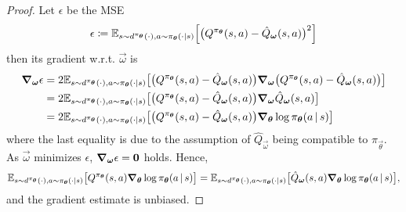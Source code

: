 			\begin{proof}
				Let \(\epsilon\) be the \ac{MSE}
				\begin{equation}
					\epsilon \coloneqq \mathbb{E}_{s \sim d^{\pi_{\bm{\theta}}}(\cdot), a \sim \pi_{\bm{\theta}}(\cdot \vert s)}\Bigl[ \bigl( Q^{\pi_{\bm{\theta}}}(s, a) - \hat{Q}_{\bm{\omega}}(s, a) \bigr)^2 \Bigr]
				\end{equation}
				then its gradient w.r.t. \(\vec{\omega}\) is
				\begin{align}
					\grad_{\bm{\omega}} \epsilon
					 & = 2 \mathbb{E}_{s \sim d^{\pi_{\bm{\theta}}}(\cdot), a \sim \pi_{\bm{\theta}}(\cdot \vert s)}\bigl[ \bigl( Q^{\pi_{\bm{\theta}}}(s, a) - \hat{Q}_{\bm{\omega}}(s, a) \bigr) \grad_{\bm{\omega}} \bigl( Q^{\pi_{\bm{\theta}}}(s, a) - \hat{Q}_{\bm{\omega}}(s, a) \bigr) \bigr] \\
					 & = 2 \mathbb{E}_{s \sim d^{\pi_{\bm{\theta}}}(\cdot), a \sim \pi_{\bm{\theta}}(\cdot \vert s)}\bigl[ \bigl( Q^{\pi_{\bm{\theta}}}(s, a) - \hat{Q}_{\bm{\omega}}(s, a) \bigr) \grad_{\bm{\omega}} \hat{Q}_{\bm{\omega}}(s, a) \bigr]                                              \\
					 & = 2 \mathbb{E}_{s \sim d^{\pi_{\bm{\theta}}}(\cdot), a \sim \pi_{\bm{\theta}}(\cdot \vert s)}\bigl[ \bigl( Q^{\pi_{\bm{\theta}}}(s, a) - \hat{Q}_{\bm{\omega}}(s, a) \bigr) \grad_{\bm{\theta}} \log \pi_{\bm{\theta}}(a \,\vert\, s) \bigr]
				\end{align}
				where the last equality is due to the assumption of \(\hat{Q}_{\vec{\omega}}\) being compatible to \(\pi_{\vec{\theta}}\). As \(\vec{\omega}\) minimizes \(\epsilon\), \( \grad_{\bm{\omega}} \epsilon = \bm{0} \) holds. Hence,
				\begin{equation}
					\mathbb{E}_{s \sim d^{\pi_{\bm{\theta}}}(\cdot), a \sim \pi_{\bm{\theta}}(\cdot \vert s)}\bigl[ Q^{\pi_{\bm{\theta}}}(s, a) \grad_{\bm{\theta}} \log \pi_{\bm{\theta}}(a \,\vert\, s) \bigr] = \mathbb{E}_{s \sim d^{\pi_{\bm{\theta}}}(\cdot), a \sim \pi_{\bm{\theta}}(\cdot \vert s)}\bigl[ \hat{Q}_{\bm{\omega}}(s, a) \grad_{\bm{\theta}} \log \pi_{\bm{\theta}}(a \,\vert\, s) \bigr],
				\end{equation}
				and the gradient estimate is unbiased.
			\end{proof}

